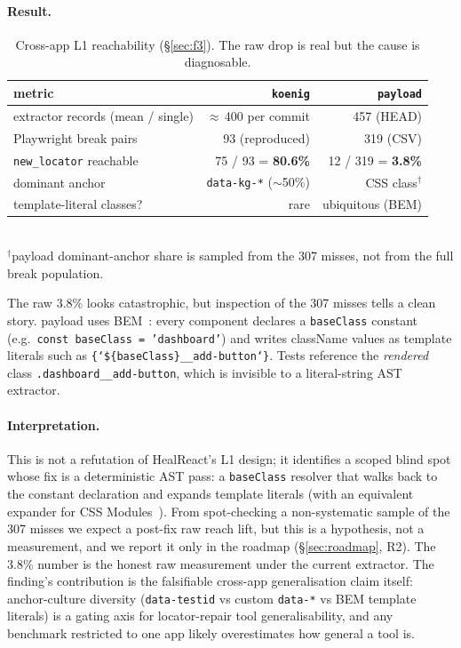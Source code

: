 \paragraph{Result.}
\begin{table}[t]
\centering
\caption{Cross-app L1 reachability (\S\ref{sec:f3}). The raw drop is real but the cause is diagnosable.}
\label{tab:cross-app}
\small
\begin{tabular}{lrr}
\toprule
metric & \texttt{koenig} & \texttt{payload} \\
\midrule
extractor records (mean / single) & $\approx$\,400 per commit & 457 (HEAD) \\
Playwright break pairs & 93 (reproduced) & 319 (CSV) \\
\texttt{new\_locator} reachable & 75 / 93 = \textbf{80.6\%} & 12 / 319 = \textbf{3.8\%} \\
\midrule
dominant anchor & \texttt{data-kg-*} ($\sim$50\%) & CSS class$^\dagger$ \\
template-literal classes? & rare & ubiquitous (BEM) \\
\bottomrule
\end{tabular}
\\[2pt]
{\scriptsize $^\dagger$payload dominant-anchor share is sampled from the 307 misses, not from the full break population.}
\end{table}

The raw 3.8\% looks catastrophic, but inspection of the 307 misses tells a clean story. payload uses BEM~\cite{bemMethodology}: every component declares a \texttt{baseClass} constant (e.g.\ \texttt{const baseClass = 'dashboard'}) and writes className values as template literals such as \texttt{\{`\$\{baseClass\}\_\_add-button`\}}. Tests reference the \emph{rendered} class \texttt{.dashboard\_\_add-button}, which is invisible to a literal-string AST extractor.

\paragraph{Interpretation.}
This is not a refutation of HealReact's L1 design; it identifies a scoped blind spot whose fix is a deterministic AST pass: a \texttt{baseClass} resolver that walks back to the constant declaration and expands template literals (with an equivalent expander for CSS Modules~\cite{cssModules}). From spot-checking a non-systematic sample of the 307 misses we expect a post-fix raw reach lift, but this is a hypothesis, not a measurement, and we report it only in the roadmap (\S\ref{sec:roadmap}, R2). The 3.8\% number is the honest raw measurement under the current extractor. The finding's contribution is the falsifiable cross-app generalisation claim itself: anchor-culture diversity (\texttt{data-testid} vs custom \texttt{data-*} vs BEM template literals) is a gating axis for locator-repair tool generalisability, and any benchmark restricted to one app likely overestimates how general a tool is.
